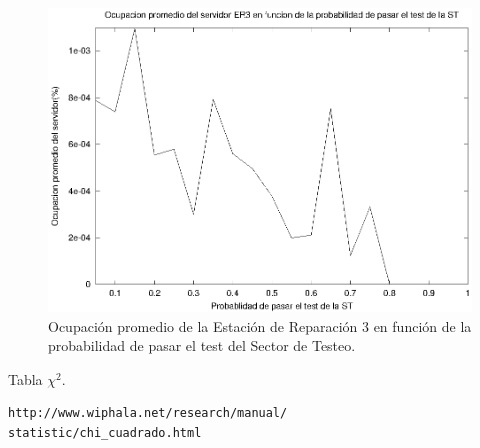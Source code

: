 \documentclass[a4paper,10pt]{article}
\begin{document}
\begin{figure}[ht]
\begin{center}
\includegraphics[width=15cm]{./img/ss_ER3.eps}
\caption{\label{fig:ss_ER3} Ocupaci\'on promedio de la Estaci\'on de Reparaci\'on 3 en funci\'on de la probabilidad de pasar el test del Sector de Testeo.}
\end{center}
\end{figure}

\begin{thebibliography}{10}
 Tabla $\chi^{2}$.
\begin{verbatim}
http://www.wiphala.net/research/manual/
statistic/chi_cuadrado.html
\end{verbatim}
\end{thebibliography}
\end{document}
